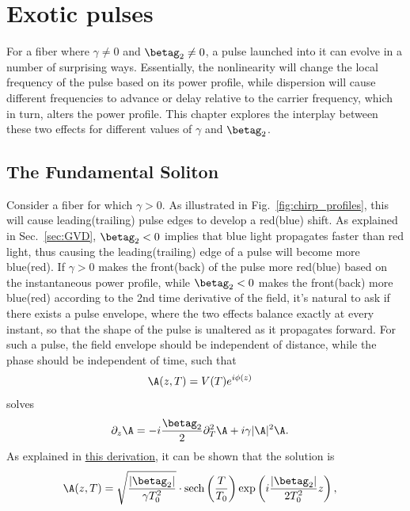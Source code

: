 \chapter{Exotic pulses}
\label{ch:Exotic}

For a fiber where $\gamma\neq 0$ and $\betag_2\neq 0$, a pulse launched into it can evolve in a number of surprising ways. Essentially, the nonlinearity will change the local frequency of the pulse based on its power profile, while dispersion will cause different frequencies to advance or delay relative to the carrier frequency, which in turn, alters the power profile. This chapter explores the interplay between these two effects for different values of $\gamma$ and $\betag_2$. 


\section{The Fundamental Soliton}
\label{sec:soliton}
Consider a fiber for which $\gamma>0$. As illustrated in Fig.~\ref{fig:chirp_profiles}, this will cause leading(trailing) pulse edges to develop a red(blue) shift. As explained in Sec.~\ref{sec:GVD}, $\betag_2<0$ implies that blue light propagates faster than red light, thus causing the leading(trailing) edge of a pulse will become more blue(red). If $\gamma>0$ makes the front(back) of the pulse more red(blue) based on the instantaneous power profile, while $\betag_2<0$ makes the front(back) more blue(red) according to the 2nd time derivative of the field, it's natural to ask if there exists a pulse envelope, where the two effects balance exactly at every instant, so that the shape of the pulse is unaltered as it propagates forward. For such a pulse, the field envelope should be independent of distance, while the phase should be independent of time, such that
\begin{align}
    \A(z,T) &= V(T)e^{i\phi(z)}
\end{align}
solves 
\begin{align}
\label{eq:NLSE_soliton}
    \partial_z\A &=  -i  \frac{\betag_2}{2}\partial_T^2\A+i\gamma|\A|^2\A.
\end{align}
As explained in \href{https://github.com/OleKrarup123/NLSE-vector-solver/blob/main/TutorialVideos/Soliton-Video/Fundamental_soliton_derivation.pdf}{this derivation}, it can be shown that the solution is
\begin{align}
    \A(z,T) &= \sqrt{\frac{|\betag_2|}{\gamma T_0^2}}\cdot\text{sech}\left(\frac{T}{T_0}\right)\exp\left(i\frac{|\betag_2|}{2T_0^2}z\right),
\end{align}
